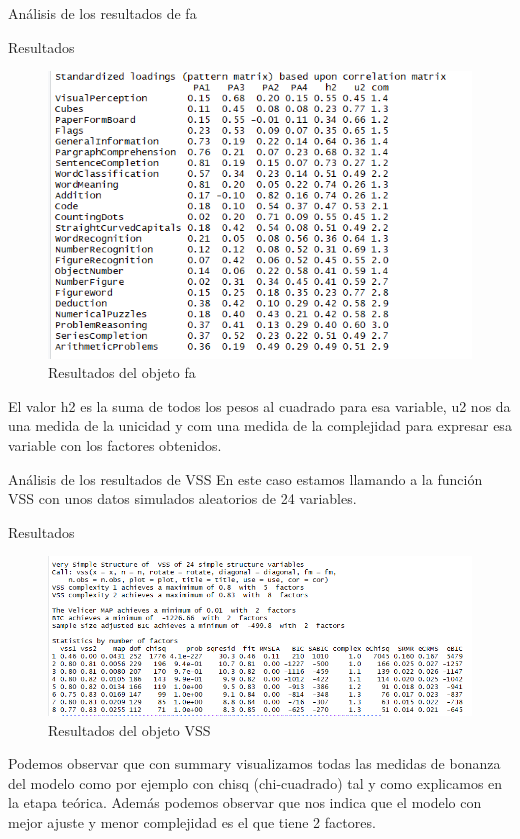 \documentclass[10pt]{beamer}
\begin{document}
\begin{frame}[fragile]{Análisis de los resultados de fa}
\begin{alertblock}{Resultados}
	\begin{figure}
		\includegraphics[scale=0.4]{./Imagenes/res_fa.png}
		\caption{Resultados del objeto fa}
	\end{figure}
	El valor h2 es la suma de todos los pesos al cuadrado para esa variable, u2 nos da una medida de la unicidad y com una medida de la complejidad para expresar esa variable con los factores obtenidos.
\end{alertblock}
\end{frame}

\begin{frame}[fragile]{Análisis de los resultados de VSS}
En este caso estamos llamando a la función VSS con unos datos simulados aleatorios de 24 variables.
\begin{alertblock}{Resultados}
	\begin{figure}
		\includegraphics[scale=0.27]{./Imagenes/res_vss1.png}
		\caption{Resultados del objeto VSS}
	\end{figure}
	Podemos observar que con summary visualizamos todas las medidas de bonanza del modelo como por ejemplo con chisq (chi-cuadrado) tal y como explicamos en la etapa teórica. Además podemos observar que nos indica que el modelo con mejor ajuste y menor complejidad es el que tiene 2 factores.
\end{alertblock}
\end{frame}
\end{document}
